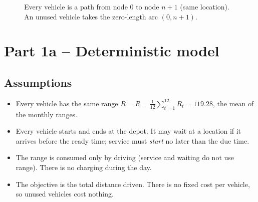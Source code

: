 \documentclass[11pt,a4paper]{article}
\theoremstyle{definition}
\begin{document}
\begin{figure}[H]
\centering
{}
\caption{Every vehicle is a path from node $0$ to node $n+1$ (same location). An unused vehicle takes the zero-length arc $(0,n+1)$.}
\end{figure}

\section{Part 1a -- Deterministic model}
\subsection{Assumptions}
\begin{itemize}
\item Every vehicle has the same range $R=\bar R=\frac1{12}\sum_{t=1}^{12}R_t=119.28$, the mean of the monthly ranges.
\item Every vehicle starts and ends at the depot. It may wait at a location if it arrives before the ready time; service must \emph{start} no later than the due time.
\item The range is consumed only by driving (service and waiting do not use range). There is no charging during the day.
\item The objective is the total distance driven. There is no fixed cost per vehicle, so unused vehicles cost nothing.
\end{itemize}
\end{document}

